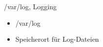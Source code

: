 \begin{frame}{/var/log, Logging}
\begin{itemize}
\item /var/log
\item Speicherort für Log-Dateien
\end{itemize}
\end{frame}